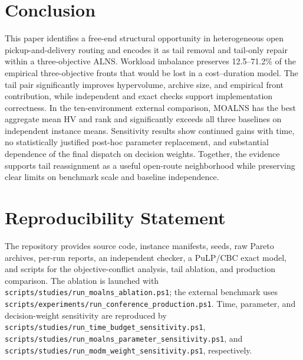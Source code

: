 \documentclass[11pt,a4paper]{article}
\newcommand{\MOALNS}{MOALNS}
\begin{document}
\section{Conclusion}

This paper identifies a free-end structural opportunity in heterogeneous open
pickup-and-delivery routing and encodes it as tail removal and tail-only repair
within a three-objective ALNS. Workload imbalance preserves 12.5--71.2\% of the
empirical three-objective fronts that would be lost in a cost--duration model.
The tail pair significantly improves hypervolume, archive size, and empirical
front contribution, while independent and exact checks support implementation
correctness. In the ten-environment external comparison, \MOALNS{} has the best
aggregate mean HV and rank and significantly exceeds all three baselines on
independent instance means. Sensitivity results show continued gains with time,
no statistically justified post-hoc parameter replacement, and substantial
dependence of the final dispatch on decision weights. Together, the evidence
supports tail reassignment as a useful open-route neighborhood while preserving
clear limits on benchmark scale and baseline independence.

\section*{Reproducibility Statement}

The repository provides source code, instance manifests, seeds, raw Pareto
archives, per-run reports, an independent checker, a PuLP/CBC exact model, and
scripts for the objective-conflict analysis, tail ablation, and production
comparison. The ablation is launched with
\texttt{scripts/studies/run\_moalns\_ablation.ps1}; the external benchmark uses
\texttt{scripts/experiments/run\_conference\_production.ps1}. Time, parameter,
and decision-weight
sensitivity are reproduced by
\texttt{scripts/studies/run\_time\_budget\_sensitivity.ps1},
\texttt{scripts/studies/run\_moalns\_parameter\_sensitivity.ps1}, and
\texttt{scripts/studies/run\_modm\_weight\_sensitivity.ps1}, respectively.



\end{document}
